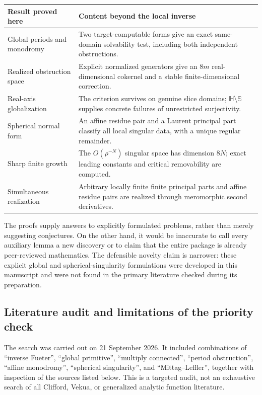 \documentclass[11pt,a4paper]{article}
\numberwithin{equation}{section}
\theoremstyle{definition}
\theoremstyle{remark}
\newcommand{\HH}{\mathbb H}
\newcommand{\SSS}{\mathbb S}
\begin{document}
\begin{center}
\small
\renewcommand{\arraystretch}{1.15}
\begin{tabularx}{\textwidth}{@{}p{}X@{}}
\toprule
Result proved here & Content beyond the local inverse\\
\midrule
Global periods and monodromy & Two target-computable forms give an exact
same-domain solvability test, including both independent obstructions.\\
Realized obstruction space & Explicit normalized generators give an $8m$
real-dimensional cokernel and a stable finite-dimensional correction.\\
Real-axis globalization & The criterion survives on genuine slice domains;
$\HH\setminus\SSS$ supplies concrete failures of unrestricted surjectivity.\\
Spherical normal form & An affine residue pair and a Laurent principal part
classify all local singular data, with a unique regular remainder.\\
Sharp finite growth & The $O(\rho^{-N})$ singular space has dimension $8N$;
exact leading constants and critical removability are computed.\\
Simultaneous realization & Arbitrary locally finite finite principal parts
and affine residue pairs are realized through meromorphic second derivatives.\\
\bottomrule
\end{tabularx}
\end{center}

The proofs supply answers to explicitly formulated problems, rather than
merely suggesting conjectures. On the other hand, it would be inaccurate to
call every auxiliary lemma a new discovery or to claim that the entire
package is already peer-reviewed mathematics. The defensible novelty claim
is narrower: these explicit global and spherical-singularity formulations
were developed in this manuscript and were not found in the primary
literature checked during its preparation.

\subsection{Literature audit and limitations of the priority check}
The search was carried out on 21 September 2026. It included combinations
of ``inverse Fueter'', ``global primitive'', ``multiply connected'',
``period obstruction'', ``affine monodromy'', ``spherical singularity'',
and ``Mittag--Leffler'', together with inspection of the sources listed
below. This is a targeted audit, not an exhaustive search of all Clifford,
Vekua, or generalized analytic function literature.
\end{document}
